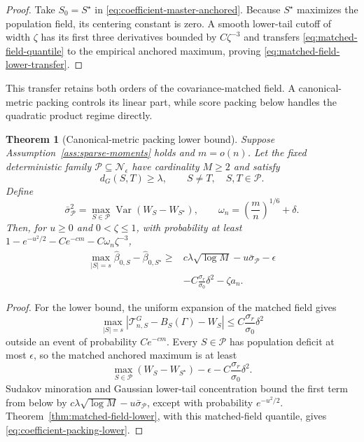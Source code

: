 \documentclass[a4paper,11pt,english]{article}
\newtheorem{theorem}{Theorem}[section]
\newcommand{\Var}{\operatorname{Var}}
\begin{document}
\begin{proof}
Take $S_0=S^\star$ in \eqref{eq:coefficient-master-anchored}.  Because
$S^\star$ maximizes the
population field, its centering constant is zero.  A smooth lower-tail
cutoff of width $\zeta$ has its first three derivatives bounded by
$C\zeta^{-3}$ and transfers \eqref{eq:matched-field-quantile} to the
empirical anchored maximum, proving
\eqref{eq:matched-field-lower-transfer}.
\end{proof}

This transfer retains both orders of the covariance-matched field.  A
canonical-metric packing controls its linear part, while score packing
below handles the quadratic product regime directly.

\begin{theorem}[Canonical-metric packing lower bound]
\label{thm:coefficient-packing}
Suppose Assumption~\ref{ass:sparse-moments} holds and $m=o(n)$.
Let the fixed deterministic family
$\mathcal P\subseteq\mathcal N_\epsilon$ have cardinality $M\ge2$
and satisfy
\begin{equation}\label{eq:coefficient-packing}
        d_G(S,T)\ge\lambda,
        \qquad S\ne T,\quad S,T\in\mathcal P.
\end{equation}
Define
\begin{equation*}
        \bar\sigma_{\mathcal P}^2
        =\max_{S\in\mathcal P}
        \Var(W_S-W_{S^\star}),
        \qquad
        \omega_n=\left(\frac mn\right)^{1/6}+\delta.
\end{equation*}
Then, for $u\ge0$ and $0<\zeta\le1$, with probability at least
$1-e^{-u^2/2}-Ce^{-cm}-C\omega_n\zeta^{-3}$,
\begin{equation}\label{eq:coefficient-packing-lower}
\begin{split}
        \max_{|S|=s}\hat\beta_{0,S}
        -\hat\beta_{0,S^\star}
        \ge{}&
        c\lambda\sqrt{\log M}
        -u\bar\sigma_{\mathcal P}-\epsilon\\
        &-C\frac{\sigma_r}{\sigma_0}\delta^2-\zeta a_n .
\end{split}
\end{equation}
\end{theorem}

\begin{proof}
For the lower bound, the uniform expansion of the matched field gives
\begin{equation*}
        \max_{|S|=s}
        |\mathcal T^G_{n,S}-B_S(\Gamma)-W_S|
        \le C\frac{\sigma_r}{\sigma_0}\delta^2
\end{equation*}
outside an event of probability $Ce^{-cm}$.  Every
$S\in\mathcal P$ has population deficit at most $\epsilon$, so the
matched anchored maximum is at least
\begin{equation*}
        \max_{S\in\mathcal P}(W_S-W_{S^\star})
        -\epsilon-C\frac{\sigma_r}{\sigma_0}\delta^2.
\end{equation*}
Sudakov minoration and Gaussian lower-tail concentration bound the first
term from below by
$c\lambda\sqrt{\log M}-u\bar\sigma_{\mathcal P}$, except with
probability $e^{-u^2/2}$.  Theorem~\ref{thm:matched-field-lower}, with
this matched-field quantile, gives
\eqref{eq:coefficient-packing-lower}.
\end{proof}
\end{document}
